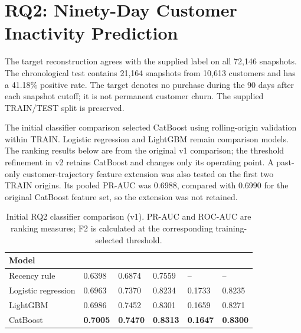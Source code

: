 \section{RQ2: Ninety-Day Customer Inactivity Prediction}

The target reconstruction agrees with the supplied label on all 72,146
snapshots. The chronological test contains 21,164 snapshots from 10,613
customers and has a 41.18\% positive rate. The target denotes no purchase
during the 90 days after each snapshot cutoff; it is not permanent customer
churn. The supplied TRAIN/TEST split is preserved.

The initial classifier comparison selected CatBoost using rolling-origin
validation within TRAIN. Logistic regression and LightGBM remain comparison
models. The ranking results below are from the original v1 comparison; the
threshold refinement in v2 retains CatBoost and changes only its operating
point. A past-only customer-trajectory feature extension was also tested on
the first two TRAIN origins. Its pooled PR-AUC was 0.6988, compared with
0.6990 for the original CatBoost feature set, so the extension was not
retained.

\begin{table}[H]
\centering
\small
\caption{Initial RQ2 classifier comparison (v1). PR-AUC and ROC-AUC are ranking measures; F2 is calculated at the corresponding training-selected threshold.}
\label{tab:rq2_customer_prediction_results}
\begin{tabularx}{\textwidth}{|Y|C{0.12\textwidth}|C{0.13\textwidth}|C{0.15\textwidth}|C{0.13\textwidth}|C{0.11\textwidth}|}
\hline
\textbf{Model} & \textbf{} & \textbf{} & \textbf{} & \textbf{} & \textbf{} \\
\hline
Recency rule & 0.6398 & 0.6874 & 0.7559 & -- & -- \\
\hline
Logistic regression & 0.6963 & 0.7370 & 0.8234 & 0.1733 & 0.8235 \\
\hline
LightGBM & 0.6986 & 0.7452 & 0.8301 & 0.1659 & 0.8271 \\
\hline
CatBoost & \textbf{0.7005} & \textbf{0.7470} & \textbf{0.8313} & \textbf{0.1647} & \textbf{0.8300} \\
\hline
\end{tabularx}
\end{table}

